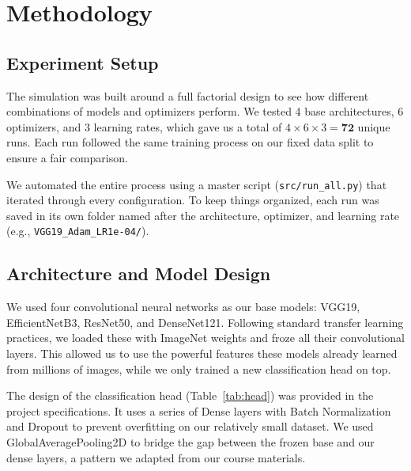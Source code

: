 \section{Methodology}
\label{sec:methodology}

\subsection{Experiment Setup}

The simulation was built around a full factorial design to see how different combinations of models and optimizers perform. We tested 4 base architectures, 6 optimizers, and 3 learning rates, which gave us a total of $4 \times 6 \times 3 = \mathbf{72}$ unique runs. Each run followed the same training process on our fixed data split to ensure a fair comparison.

We automated the entire process using a master script (\texttt{src/run\_all.py}) that iterated through every configuration. To keep things organized, each run was saved in its own folder named after the architecture, optimizer, and learning rate (e.g., \texttt{VGG19\_Adam\_LR1e-04/}).

\subsection{Architecture and Model Design}

We used four convolutional neural networks as our base models: VGG19, EfficientNetB3, ResNet50, and DenseNet121. Following standard transfer learning practices, we loaded these with ImageNet weights and froze all their convolutional layers. This allowed us to use the powerful features these models already learned from millions of images, while we only trained a new classification head on top.

The design of the classification head (Table~\ref{tab:head}) was provided in the project specifications. It uses a series of Dense layers with Batch Normalization and Dropout to prevent overfitting on our relatively small dataset. We used GlobalAveragePooling2D to bridge the gap between the frozen base and our dense layers, a pattern we adapted from our course materials.

